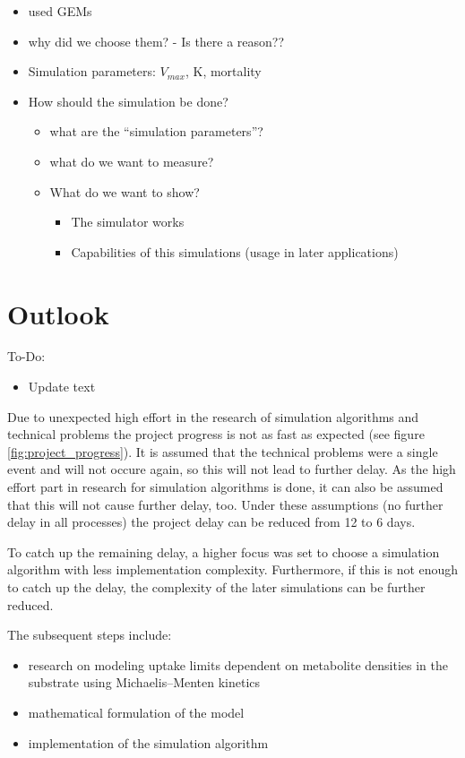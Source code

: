 \documentclass[a4paper,10pt]{article}
\begin{document}
\begin{itemize}
 \item used GEMs
 \item why did we choose them? - Is there a reason??
 \item Simulation parameters: $V_{max}$, K, mortality
 \item How should the simulation be done?
 \begin{itemize}
  \item what are the ``simulation parameters''?
  \item what do we want to measure?
  \item What do we want to show?
  \begin{itemize}
   \item The simulator works
   \item Capabilities of this simulations (usage in later applications)
  \end{itemize}
 \end{itemize}
\end{itemize}



\section{Outlook}

To-Do:
\begin{itemize}
 \item Update text
\end{itemize}


Due to unexpected high effort in the research of simulation algorithms and technical problems the project progress is not as fast
as expected (see figure \ref{fig:project_progress}). It is assumed that the technical problems were a single event and will not
occure again, so this will not lead to further delay. As the high effort part in research for simulation algorithms is done, it
can also be assumed that this will not cause further delay, too. Under these assumptions (no further delay in all processes) the
project delay can be reduced from 12 to 6 days.

To catch up the remaining delay, a higher focus was set to choose a simulation algorithm with less implementation complexity.
Furthermore, if this is not enough to catch up the delay, the complexity of the later simulations can be further reduced.

\vspace{0.5cm}
The subsequent steps include:
\begin{itemize}
 \item research on modeling uptake limits dependent on metabolite densities in the substrate using Michaelis–Menten kinetics
 \item mathematical formulation of the model
 \item implementation of the simulation algorithm
\end{itemize}




\newpage

\printbibliography
\end{document}
